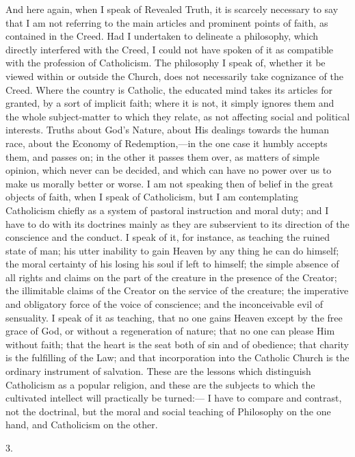 And here again, when I speak of Revealed Truth, it is scarcely
necessary to say that I am not referring to the main articles and
prominent points of faith, as contained in the Creed. Had I undertaken
to delineate a philosophy, which directly interfered with the Creed, I
could not have spoken of it as compatible with the profession of
Catholicism. The philosophy I speak of, whether it be viewed within or
outside the Church, does not necessarily take cognizance of the Creed.
Where the country is Catholic, the educated mind takes its
articles for granted, by a sort of implicit faith; where it is not, it
simply ignores them and the whole subject-matter to which they relate,
as not affecting social and political interests. Truths about God's
Nature, about His dealings towards the human race, about the Economy
of Redemption,—in the one case it humbly accepts them, and passes
on; in the other it passes them over, as matters of simple opinion,
which never can be decided, and which can have no power over us to
make us morally better or worse. I am not speaking then of belief in
the great objects of faith, when I speak of Catholicism, but I am
contemplating Catholicism chiefly as a system of pastoral instruction
and moral duty; and I have to do with its doctrines mainly as they are
subservient to its direction of the conscience and the conduct. I
speak of it, for instance, as teaching the ruined state of man; his
utter inability to gain Heaven by any thing he can do himself; the
moral certainty of his losing his soul if left to himself; the simple
absence of all rights and claims on the part of the creature in the
presence of the Creator; the illimitable claims of the Creator on the
service of the creature; the imperative and obligatory force of the
voice of conscience; and the inconceivable evil of sensuality. I speak
of it as teaching, that no one gains Heaven except by the free grace
of God, or without a regeneration of nature; that no one can please
Him without faith; that the heart is the seat both of sin and of
obedience; that charity is the fulfilling of the Law; and that
incorporation into the Catholic Church is the ordinary instrument of
salvation. These are the lessons which distinguish Catholicism as a
popular religion, and these are the subjects to which the cultivated
intellect will practically be turned:— I have to compare and
contrast, not the doctrinal, but the moral and social teaching of
Philosophy on the one hand, and Catholicism on the other.

3.

